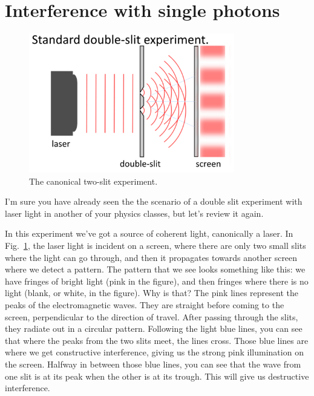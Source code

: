 \section{Interference with single photons}

\begin{figure}[H]
   \centering
    \includegraphics[width=0.8\textwidth]{lesson6/standard_double_slit.pdf}    
        \caption{The canonical two-slit experiment.}
    \label{fig:two-slit}
   
\end{figure}

I'm sure you have already seen the the scenario of a double slit experiment with laser light in another of your physics classes, but let's review it again.

In this experiment we've got a source of coherent light, canonically a laser. In Fig.~\ref{fig:two-slit}, the laser light is incident on a screen, where there are only two small slits where the light can go through, and then it propagates towards another screen where we detect a pattern. The pattern that we see looks something like this: we have fringes of bright light (pink in the figure), and then fringes where there is no light (blank, or white, in the figure). Why is that?  The pink lines represent the peaks of the electromagnetic waves. They are straight before coming to the screen, perpendicular to the direction of travel. After passing through the slits, they radiate out in a circular pattern.  Following the light blue lines, you can see that where the peaks from the two slits meet, the lines cross.  Those blue lines are where we get constructive interference, giving us the strong pink illumination on the screen. Halfway in between those blue lines, you can see that the wave from one slit is at its peak when the other is at its trough.  This will give us destructive interference.

